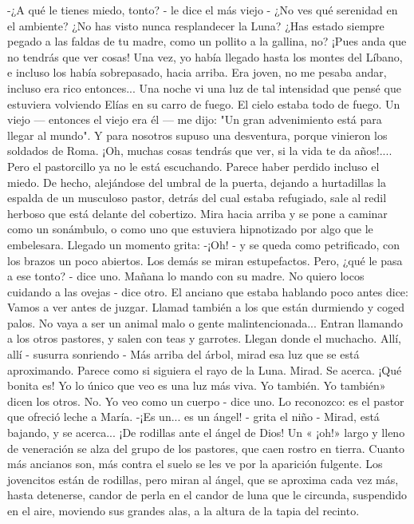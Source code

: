\documentclass[12pt]{book} %
\begin{document}
-¿A qué le tienes miedo, tonto? - le dice el más viejo - ¿No ves qué serenidad en el ambiente? ¿No has visto nunca 
resplandecer la Luna? ¿Has estado siempre pegado a las faldas de tu madre, como un pollito a la gallina, no? ¡Pues anda que no tendrás que ver cosas! Una vez, yo había llegado hasta los montes del Líbano, e incluso los había sobrepasado, hacia arriba. Era joven, no me pesaba andar, incluso era rico entonces... Una noche vi una luz de tal intensidad que pensé que estuviera volviendo Elías en su carro de fuego. El cielo estaba todo de fuego. Un viejo — entonces el viejo era él — me dijo: "Un gran advenimiento está para llegar al mundo". Y para nosotros supuso una desventura, porque vinieron los soldados de Roma. ¡Oh, muchas cosas tendrás que ver, si la vida te da años!.... 
Pero el pastorcillo ya no le está escuchando. Parece haber perdido incluso el miedo. De hecho, alejándose del umbral 
de la puerta, dejando a hurtadillas la espalda de un musculoso pastor, detrás del cual estaba refugiado, sale al redil herboso que está delante del cobertizo. Mira hacia arriba y se pone a caminar como un sonámbulo, o como uno que estuviera hipnotizado por algo que le embelesara. Llegado un momento grita: 
-¡Oh! - y se queda como petrificado, con los brazos un poco abiertos. 
Los demás se miran estupefactos. 
Pero, ¿qué le pasa a ese tonto? - dice uno. 
Mañana lo mando con su madre. No quiero locos cuidando a las ovejas - dice otro. 
El anciano que estaba hablando poco antes dice: 
Vamos a ver antes de juzgar. Llamad también a los que están durmiendo y coged palos. No vaya a ser un animal malo 
o gente malintencionada... 
Entran llamando a los otros pastores, y salen con teas y garrotes. Llegan donde el muchacho. 
Allí, allí - susurra sonriendo - Más arriba del árbol, mirad esa luz que se está aproximando. Parece como si siguiera el 
rayo de la Luna. Mirad. Se acerca. ¡Qué bonita es! 
Yo lo único que veo es una luz más viva. 
Yo también. 
Yo también» dicen los otros. 
No. Yo veo como un cuerpo - dice uno. Lo reconozco: es el pastor que ofreció leche a María. 
-¡Es un... es un ángel! - grita el niño - Mirad, está bajando, y se acerca... ¡De rodillas ante el ángel de Dios! 
Un « ¡oh!» largo y lleno de veneración se alza del grupo de los pastores, que caen rostro en tierra. Cuanto más ancianos 
son, más contra el suelo se les ve por la aparición fulgente. Los jovencitos están de rodillas, pero miran al ángel, que se aproxima cada vez más, hasta detenerse, candor de perla en el candor de luna que le circunda, suspendido en el aire, moviendo sus grandes alas, a la altura de la tapia del recinto. 
\end{document}
